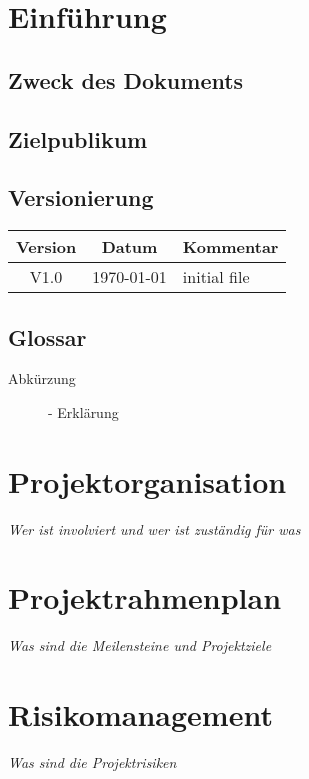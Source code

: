 \documentclass[a4paper, 10pt, fleqn]{article}
\begin{document}
	\begin{titlepage}
		\titleGM
		\thispagestyle{empty}
	\end{titlepage}
	
	\tableofcontents
	\listoffigures
	\listoftables
	
	\clearpage
	\section{Einführung}
		\subsection{Zweck des Dokuments}
		\subsection{Zielpublikum}
		\subsection{Versionierung}
			\begin{table}[h]
				\centering
				\begin{tabularx}{\textwidth}{|c|c|X|}
				\hline
				\rowcolor{shadecolor}\textbf{Version} & \textbf{Datum} & \textbf{Kommentar}\\ \hline
				V1.0 & \today & initial file \\ \hline
				\end{tabularx}
			\end{table}
		\subsection{Glossar}
			\begin{description}
				\item[Abkürzung]- Erklärung
			\end{description}

	\section{Projektorganisation}
		\textit{Wer ist involviert und wer ist zuständig für was}
	\section{Projektrahmenplan}
		\textit{Was sind die Meilensteine und Projektziele}
	\section{Risikomanagement}
		\textit{Was sind die Projektrisiken}
\end{document}
